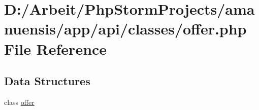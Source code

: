 \hypertarget{offer_8php}{}\section{D\+:/\+Arbeit/\+Php\+Storm\+Projects/amanuensis/app/api/classes/offer.php File Reference}
\label{offer_8php}
\subsection*{Data Structures}
\begin{DoxyCompactItemize}
\item 
class \hyperlink{classoffer}{offer}
\end{DoxyCompactItemize}
